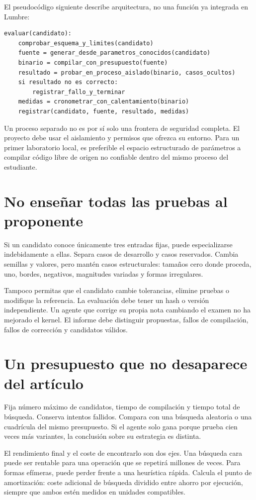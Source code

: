 \documentclass[12pt,a4paper,oneside]{report}
\begin{document}
El pseudocódigo siguiente describe arquitectura, no una función ya integrada en Lumbre:

\begin{lstlisting}
evaluar(candidato):
    comprobar_esquema_y_limites(candidato)
    fuente = generar_desde_parametros_conocidos(candidato)
    binario = compilar_con_presupuesto(fuente)
    resultado = probar_en_proceso_aislado(binario, casos_ocultos)
    si resultado no es correcto:
        registrar_fallo_y_terminar
    medidas = cronometrar_con_calentamiento(binario)
    registrar(candidato, fuente, resultado, medidas)
\end{lstlisting}
Un proceso separado no es por sí solo una frontera de seguridad completa. El proyecto debe usar el aislamiento y permisos que ofrezca su entorno. Para un primer laboratorio local, es preferible el espacio estructurado de parámetros a compilar código libre de origen no confiable dentro del mismo proceso del estudiante.

\section{No enseñar todas las pruebas al proponente}
Si un candidato conoce únicamente tres entradas fijas, puede especializarse indebidamente a ellas. Separa casos de desarrollo y casos reservados. Cambia semillas y valores, pero mantén casos estructurales: tamaños cero donde proceda, uno, bordes, negativos, magnitudes variadas y formas irregulares.

Tampoco permitas que el candidato cambie tolerancias, elimine pruebas o modifique la referencia. La evaluación debe tener un hash o versión independiente. Un agente que corrige su propia nota cambiando el examen no ha mejorado el kernel. El informe debe distinguir propuestas, fallos de compilación, fallos de corrección y candidatos válidos.

\section{Un presupuesto que no desaparece del artículo}
Fija número máximo de candidatos, tiempo de compilación y tiempo total de búsqueda. Conserva intentos fallidos. Compara con una búsqueda aleatoria o una cuadrícula del mismo presupuesto. Si el agente solo gana porque prueba cien veces más variantes, la conclusión sobre su estrategia es distinta.

El rendimiento final y el coste de encontrarlo son dos ejes. Una búsqueda cara puede ser rentable para una operación que se repetirá millones de veces. Para formas efímeras, puede perder frente a una heurística rápida. Calcula el punto de amortización: coste adicional de búsqueda dividido entre ahorro por ejecución, siempre que ambos estén medidos en unidades compatibles.
\end{document}
